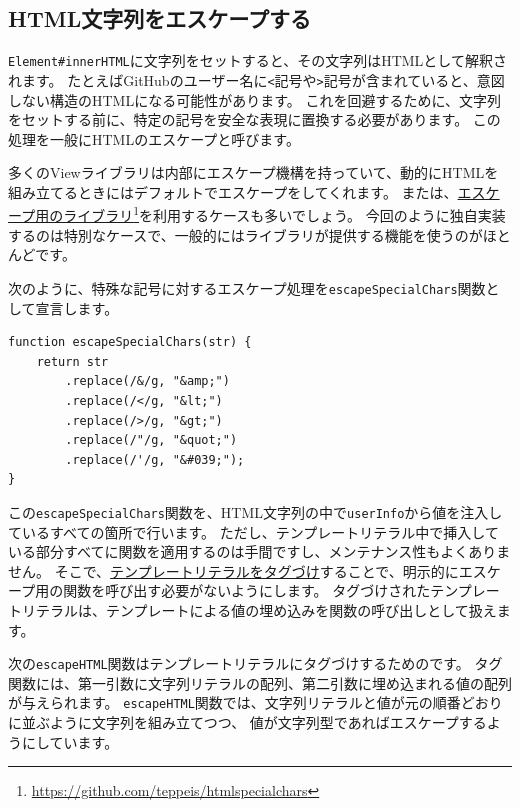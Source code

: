 \hypertarget{escape-html}{%
\subsection{HTML文字列をエスケープする}\label{escape-html}}

\texttt{Element\#innerHTML}に文字列をセットすると、その文字列はHTMLとして解釈されます。
たとえばGitHubのユーザー名に\texttt{<}記号や\texttt{>}記号が含まれていると、意図しない構造のHTMLになる可能性があります。
これを回避するために、文字列をセットする前に、特定の記号を安全な表現に置換する必要があります。
この処理を一般にHTMLのエスケープと呼びます。

多くのViewライブラリは内部にエスケープ機構を持っていて、動的にHTMLを組み立てるときにはデフォルトでエスケープをしてくれます。
または、\href{https://github.com/teppeis/htmlspecialchars}{エスケープ用のライブラリ}\footnote{\url{https://github.com/teppeis/htmlspecialchars}}を利用するケースも多いでしょう。
今回のように独自実装するのは特別なケースで、一般的にはライブラリが提供する機能を使うのがほとんどです。

次のように、特殊な記号に対するエスケープ処理を\texttt{escapeSpecialChars}関数として宣言します。

\begin{lstlisting}
function escapeSpecialChars(str) {
    return str
        .replace(/&/g, "&amp;")
        .replace(/</g, "&lt;")
        .replace(/>/g, "&gt;")
        .replace(/"/g, "&quot;")
        .replace(/'/g, "&#039;");
}
\end{lstlisting}

この\texttt{escapeSpecialChars}関数を、HTML文字列の中で\texttt{userInfo}から値を注入しているすべての箇所で行います。
ただし、テンプレートリテラル中で挿入している部分すべてに関数を適用するのは手間ですし、メンテナンス性もよくありません。
そこで、\href{https://developer.mozilla.org/ja/docs/Web/JavaScript/Reference/template_strings\#タグづけされたTemplate_literal}{テンプレートリテラルをタグづけ}することで、明示的にエスケープ用の関数を呼び出す必要がないようにします。
タグづけされたテンプレートリテラルは、テンプレートによる値の埋め込みを関数の呼び出しとして扱えます。

次の\texttt{escapeHTML}関数はテンプレートリテラルにタグづけするための\textbf{}です。
タグ関数には、第一引数に文字列リテラルの配列、第二引数に埋め込まれる値の配列が与えられます。
\texttt{escapeHTML}関数では、文字列リテラルと値が元の順番どおりに並ぶように文字列を組み立てつつ、
値が文字列型であればエスケープするようにしています。

